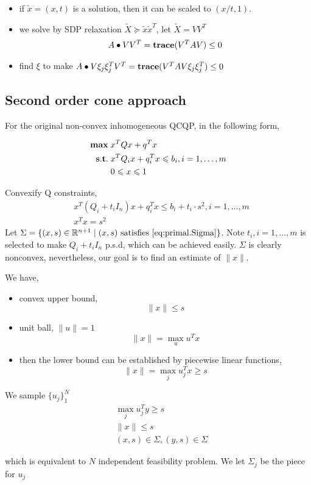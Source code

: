 \documentclass[../main]{subfiles}
\begin{document}
\begin{itemize}
    \item if \(\tilde x=(x, t)\) is a solution, then it can be scaled to \((x/t, 1)\).
    \item we solve by SDP relaxation \(\tilde X \succeq \tilde x\tilde x^T\), let \(\tilde X = VV^T\)
          \begin{align*}
               & A \bullet VV^T = \mathbf{trace}(V^TAV) \le 0 \\
          \end{align*}
    \item find \(\xi\) to make \(A \bullet V\xi_{j}\xi_{j}^TV^T = \mathbf{trace}{(V^TAV\xi_{j}\xi_{j}^T)} \le 0\)
\end{itemize}


\subsection{Second order cone approach}
For the original non-convex inhomogeneous QCQP, in the following form,

\begin{align}
    \mathbf{max}\; & x^T Q x+q^T x                                    \\
    \mathbf{s.t.}\; & x^T Q_i x+q_i^T x \leqslant b_{i}, i= 1,\dots, m \\
        & 0 \leqslant x \leqslant 1
\end{align}

Convexify Q constraints,
\begin{equation}\label{eq:primal.Sigma}
    \begin{aligned}
         & x^T(Q_i+t_i I_n) x+q_i^T x \leqslant b_i+ t_i \cdot s^2,i= 1,\dots, m \\
         & x^T x= s^2
    \end{aligned}
\end{equation}
Let \(\Sigma = \{(x,s)\in \mathbb R^{n+1}\mid (x,s) \textrm{ satisfies \eqref{eq:primal.Sigma}} \}\). Note \(t_i, i=1,\dots, m\) is selected to make \(Q_i+t_i I_n\) p.s.d, which can be achieved easily. \(\Sigma\) is clearly nonconvex, nevertheless, our goal is to find an estimate of \(\|x\|\).

We have,

\begin{itemize}
    \item convex upper bound,
          \begin{equation} \|x\| \le s \end{equation}
    \item unit ball, \(\|u\| = 1\)
          \begin{equation} \|x\| = \max_u u^T x \end{equation}
    \item then the lower bound can be established by piecewise linear functions,
          \begin{equation}
              \|x\| = \max_j u^T_j x \ge s
          \end{equation}
\end{itemize}

We sample \(\{u_j\}_1^N\)
\begin{align}
     & \max_j u^T_j y \ge s                 \\
     & \|x \| \le s                         \\
     & (x, s) \in \Sigma, (y, s) \in \Sigma
\end{align}

which is equivalent to \(N\) independent feasibility problem. We let \(\Sigma_j\) be the piece for \(u_j\)
\end{document}
